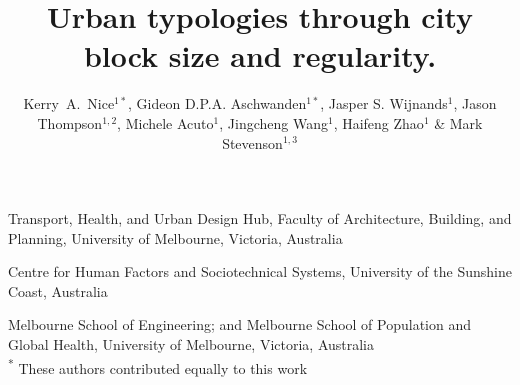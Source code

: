 \documentclass{nature}
\title{Urban typologies through city block size and regularity.}
\author{Kerry~A.~Nice$^{1*}$,
Gideon D.P.A. Aschwanden$^{1*}$,
Jasper S. Wijnands$^{1}$,
Jason Thompson$^{1,2}$,
Michele Acuto$^{1}$,
Jingcheng Wang$^{1}$,
Haifeng Zhao$^{1}$ \&
Mark Stevenson$^{1,3}$
}
\begin{document}
\maketitle

\begin{affiliations}
 \item Transport, Health, and Urban Design Hub, Faculty of Architecture, Building, and Planning, University of Melbourne, Victoria, Australia
 \item Centre for Human Factors and Sociotechnical Systems, University of the Sunshine Coast, Australia
 \item Melbourne School of Engineering; and Melbourne School of Population and Global Health, University of Melbourne, Victoria, Australia
 \\ \textsuperscript{*} These authors contributed equally to this work
\end{affiliations}
\end{document}
